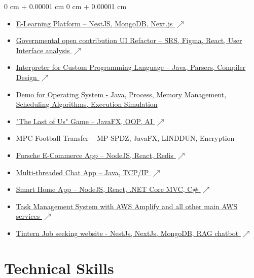 \documentclass[10pt, letterpaper]{article}
\newenvironment{highlights}{
    \begin{itemize}[
        topsep=0.10 cm,
        parsep=0.10 cm,
        partopsep=0pt,
        itemsep=0pt,
        leftmargin=0 cm + 10pt
    ]
}{
    \end{itemize}
} %
\newenvironment{onecolentry}{
    \begin{adjustwidth}{
        0 cm + 0.00001 cm
    }{
        0 cm + 0.00001 cm
    }
}{
    \end{adjustwidth}
} %
\begin{document}
        \begin{onecolentry}
            \begin{highlights}
                \item \href{https://github.com/Elite-GIU}{E-Learning Platform – NestJS, MongoDB, Next.js $\scriptscriptstyle\nearrow$}
                \item \href{https://github.com/Abdelrahman-Elnagar/UI_Refactoring/tree/main}{Governmental open contribution UI Refactor – SRS, Figma, React, User Interface analysis $\scriptscriptstyle\nearrow$}
                \item \href{https://github.com/Abdelrahman-Elnagar/Balabizo-Programming-Language}{Interpreter for Custom Programming Language – Java, Parsers, Compiler Design $\scriptscriptstyle\nearrow$}
                \item \href{https://github.com/Abdelrahman-Elnagar/Operating_System_demo}{Demo for Operating System - Java, Process, Memory Management, Scheduling Algorithms, Execution Simulation}
                \item \href{https://github.com/Abdelrahman-Elnagar/The-Last-Of-Us}{"The Last of Us" Game – JavaFX, OOP, AI $\scriptscriptstyle\nearrow$}
                \item {MPC Football Transfer – MP-SPDZ, JavaFX, LINDDUN, Encryption}
                \item \href{https://github.com/MohamedHossam2004/Porsche}{Porsche E-Commerce App – NodeJS, React, Redis $\scriptscriptstyle\nearrow$}
                \item \href{https://github.com/Abdelrahman-Elnagar/Server-Client-Chat-Application}{Multi-threaded Chat App – Java, TCP/IP $\scriptscriptstyle\nearrow$}
                \item \href{https://github.com/Abdelrahman-Elnagar/InfinitySystems}{Smart Home App – NodeJS, React, .NET Core MVC, C\# $\scriptscriptstyle\nearrow$}
                \item \href{https://production.d1rel1zoj4hes1.amplifyapp.com/}{Task Management System with AWS Amplify and all other main AWS services $\scriptscriptstyle\nearrow$}
                \item \href{https://tintern-client.fly.dev/auth/login}{Tintern Job seeking website - NestJs, NextJs, MongoDB, RAG chatbot $\scriptscriptstyle\nearrow$}
            \end{highlights}
        \end{onecolentry}


    \section{Technical Skills}
\end{document}
